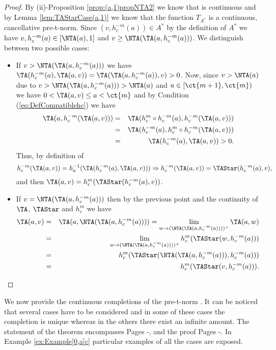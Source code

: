 \begin{proof}
	By (ii)-Proposition \ref{prop:(a,1)propNTA2} we know that \NTA is continuous and by Lemma \ref{lem:TAStarCase(a,1)} we know that the function $T_{A^*}$ is a continuous, cancellative pre-t-norm. Since  $(v,h_c^{-m}(a)) \in A^*$ by the definition of $A^*$ we have $v,h_c^{-m}(a) \in [\NTA(a),1]$ and  $v \geq \NTA(\TA(a,h_c^{-m}(a)))$. We distinguish between two possible cases:
	\begin{itemize}
		\item If $v > \NTA(\TA(a,h_c^{-m}(a)))$ we have $\TA(h_c^{-m}(a),\TA(a,v)) = \TA(\TA(a,h_c^{-m}(a)),v)>0$. Now, since $v> \NTA(a)$ due to $v>\NTA(\TA(a,h_c^{-m}(a)))>\NTA(a)$ and $a \in [\ct{m+1},\ct{m})$ we have $0<\TA(a,v) \leq a < \ct{m}$ and by Condition (\ref{eq:DefCompatiblehc}) we have
		\begin{eqnarray*}
			\TA(a,h_c^{-m}(\TA(a,v))) 
			& = & \TA(h_c^m \circ h_c^{-m}(a),h_c^{-m}(\TA(a,v))) \\
			& = & \TA(h_c^{-m}(a),h_c^m \circ h_c^{-m}(\TA(a,v)))\\
			& = & \TA(h_c^{-m}(a),\TA(a,v)) >0.
		\end{eqnarray*}
		Thus, by definition of \TAStar
		$$h_c^{-m}(\TA(a,v)) = h_a^{-1}(\TA(h_c^{-m}(a),\TA(a,v))) \Rightarrow  h_c^{-m}(\TA(a,v)) = \TAStar(h_c^{-m}(a),v),$$
		and then $\TA(a,v)=h_c^m(\TAStar(h_c^{-m}(a),v))$.
		\item If $v = \NTA(\TA(a,h_c^{-m}(a)))$ then by the previous point and the continuity of $\TA$, $\TAStar$ and $h_c^{m}$ we have
		\begin{eqnarray*}
			\TA(a,v)&=&\TA(a,\NTA(\TA(a,h_c^{-m}(a))))=\lim_{w \to (\NTA(\TA(a,h_c^{-m}(a))))^+}  \TA(a,w) \\
			&=&  \lim_{w \to (\NTA(\TA(a,h_c^{-m}(a))))^+}  h_c^{m}(\TAStar(w,h_c^{-m}(a))) \\
			&=& h_c^{m}(\TAStar(\NTA(\TA(a,h_c^{-m}(a))),h_c^{-m}(a))) \\
			&=& h_c^{m}(\TAStar(v,h_c^{-m}(a))).
		\end{eqnarray*}
	\end{itemize}
\end{proof}


We now provide the continuous completions of the pre-t-norm \TB. It can be noticed that several cases have to be considered and in some of these cases the completion is unique whereas in the others there exist an infinite amount. The statement of the theorem encompasses Pages \pageref{thm:Case6NTA(a)>a}-\pageref{eq:GeneratorCompletion(a,1)c-5}, and the proof Pages \pageref{eq:GeneratorCompletion(a,1)c-5}-\pageref{last-page-long-proof}. In Example \ref{ex:Example[0,a]c} particular examples of all the cases are exposed.

